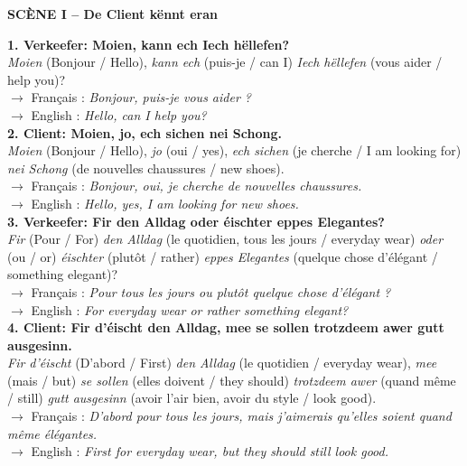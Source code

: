 \vspace{1em}

\noindent\textbf{SCÈNE I -- De Client kënnt eran}

\noindent\textbf{1. Verkeefer: Moien, kann ech Iech hëllefen?}\\
\textit{Moien} (Bonjour / Hello), \textit{kann ech} (puis-je / can I) \textit{Iech hëllefen} (vous aider / help you)?\\
$\rightarrow$ Français : \textit{Bonjour, puis-je vous aider ?}\\
$\rightarrow$ English : \textit{Hello, can I help you?}\\[0.5em]

\noindent\textbf{2. Client: Moien, jo, ech sichen nei Schong.}\\
\textit{Moien} (Bonjour / Hello), \textit{jo} (oui / yes), \textit{ech sichen} (je cherche / I am looking for) \textit{nei Schong} (de nouvelles chaussures / new shoes).\\
$\rightarrow$ Français : \textit{Bonjour, oui, je cherche de nouvelles chaussures.}\\
$\rightarrow$ English : \textit{Hello, yes, I am looking for new shoes.}\\[0.5em]

\noindent\textbf{3. Verkeefer: Fir den Alldag oder éischter eppes Elegantes?}\\
\textit{Fir} (Pour / For) \textit{den Alldag} (le quotidien, tous les jours / everyday wear) \textit{oder} (ou / or) \textit{éischter} (plutôt / rather) \textit{eppes Elegantes} (quelque chose d'élégant / something elegant)?\\
$\rightarrow$ Français : \textit{Pour tous les jours ou plutôt quelque chose d'élégant ?}\\
$\rightarrow$ English : \textit{For everyday wear or rather something elegant?}\\[0.5em]

\noindent\textbf{4. Client: Fir d'éischt den Alldag, mee se sollen trotzdeem awer gutt ausgesinn.}\\
\textit{Fir d'éischt} (D'abord / First) \textit{den Alldag} (le quotidien / everyday wear), \textit{mee} (mais / but) \textit{se sollen} (elles doivent / they should) \textit{trotzdeem awer} (quand même / still) \textit{gutt ausgesinn} (avoir l'air bien, avoir du style / look good).\\
$\rightarrow$ Français : \textit{D'abord pour tous les jours, mais j'aimerais qu'elles soient quand même élégantes.}\\
$\rightarrow$ English : \textit{First for everyday wear, but they should still look good.}\\[0.5em]

